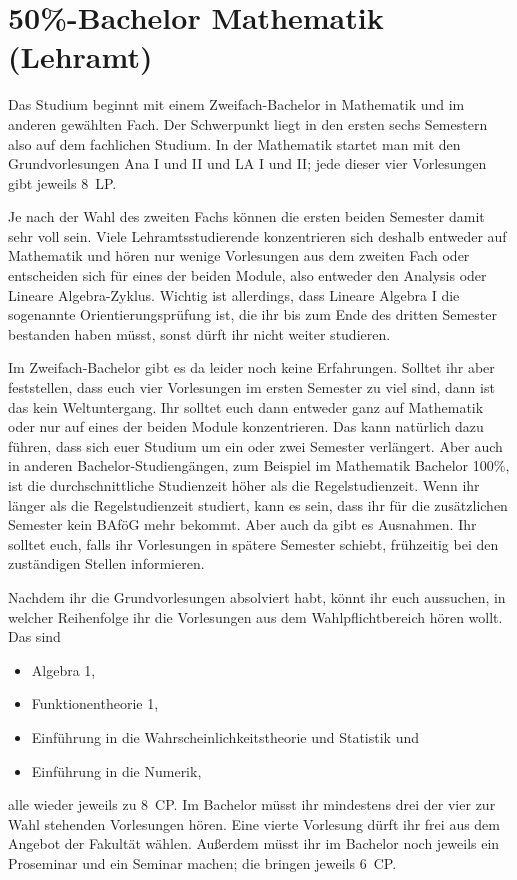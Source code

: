 \section{50\%-Bachelor Mathematik (Lehramt)}

Das Studium beginnt mit einem Zweifach-Bachelor in Mathematik und im anderen gewählten Fach. Der Schwerpunkt liegt in den ersten sechs Semestern also auf dem fachlichen Studium. In der Mathematik startet man mit den Grundvorlesungen Ana I und II und LA I und II; jede dieser vier Vorlesungen gibt jeweils 8~\gls{LP}.

Je nach der Wahl des zweiten Fachs können die ersten beiden Semester damit sehr voll sein. Viele Lehramtsstudierende konzentrieren sich deshalb entweder auf Mathematik und hören nur wenige Vorlesungen aus dem zweiten Fach oder entscheiden sich für eines der beiden Module, also entweder den Analysis oder Lineare Algebra-Zyklus. Wichtig ist allerdings, dass Lineare Algebra I die sogenannte Orientierungsprüfung ist, die ihr bis zum Ende des dritten Semester bestanden haben müsst, sonst dürft ihr nicht weiter studieren.

Im Zweifach-Bachelor gibt es da leider noch keine Erfahrungen. Solltet ihr aber feststellen, dass euch vier Vorlesungen im ersten Semester zu viel sind, dann ist das kein Weltuntergang. Ihr solltet euch dann entweder ganz auf Mathematik oder nur auf eines der beiden Module konzentrieren. Das kann natürlich dazu führen, dass sich euer Studium um ein oder zwei Semester verlängert. Aber auch in anderen Bachelor-Studiengängen, zum Beispiel im Mathematik Bachelor 100\%, ist die durchschnittliche Studienzeit höher als die Regelstudienzeit. Wenn ihr länger als die Regelstudienzeit studiert, kann es sein, dass ihr für die zusätzlichen Semester kein BAföG mehr bekommt. Aber auch da gibt es Ausnahmen. Ihr solltet euch, falls ihr Vorlesungen in spätere Semester schiebt, frühzeitig bei den zuständigen Stellen informieren.

Nachdem ihr die Grundvorlesungen absolviert habt, könnt ihr euch aussuchen, in welcher Reihenfolge ihr die Vorlesungen aus dem Wahlpflichtbereich hören wollt. Das sind
\begin{itemize}
  \item Algebra 1,
  \item Funktionentheorie 1,
  \item Einführung in die Wahrscheinlichkeitstheorie und Statistik und
  \item Einführung in die Numerik,
\end{itemize}
alle wieder jeweils zu 8~\gls{CP}. Im Bachelor müsst ihr mindestens drei der vier zur Wahl stehenden Vorlesungen hören. Eine vierte Vorlesung dürft ihr frei aus dem Angebot der Fakultät wählen. Außerdem müsst ihr im Bachelor noch jeweils ein Proseminar und ein Seminar machen; die bringen jeweils 6~\gls{CP}.

